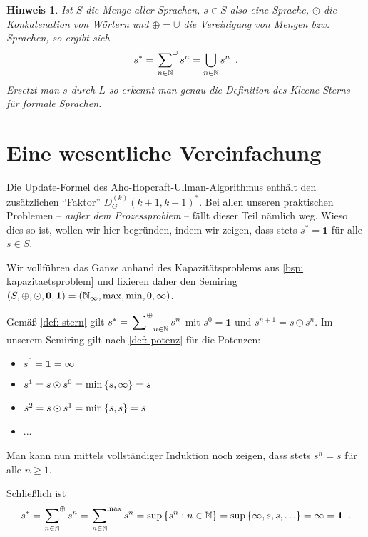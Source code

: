 \documentclass[ngerman, a4paper, 12pt]{article}
\newcommand{\satzende}{\enskip \text{.}}
\theoremstyle{mystyle}
\newtheorem{hinweis}[definition]{Hinweis}
\begin{document}
	\begin{hinweis}
		Ist $S$ die Menge aller Sprachen, $s \in S$ also eine Sprache, $\odot$ die Konkatenation von Wörtern und $\oplus = \cup$ die Vereinigung von Mengen bzw. Sprachen, so ergibt sich
		\begin{equation*}
			s^\ast = \sideset{}{^\cup}\sum_{n \in \N} s^n
			= \bigcup_{n \in \N} s^n
			\satzende
		\end{equation*}
		Ersetzt man $s$ durch $L$ so erkennt man genau die Definition des Kleene-Sterns für formale Sprachen. 
	\end{hinweis}
	
	\section{Eine wesentliche Vereinfachung}
	\label{sec: vereinfachung}
	
	Die Update-Formel des Aho-Hopcraft-Ullman-Algorithmus enthält den zusätzlichen \enquote{Faktor} $D_G^{(k)}(k+1, k+1)^\ast$. Bei allen unseren praktischen Problemen -- \textit{außer dem Prozessproblem} -- fällt dieser Teil nämlich weg. Wieso dies so ist, wollen wir hier begründen, indem wir zeigen, dass stets 
	$s^\ast = \mathbf{1}$ für alle $s \in S$.
	
	Wir vollführen das Ganze anhand des Kapazitätsproblems aus \cref{bsp: kapazitaetsproblem} und fixieren daher den Semiring $(S, \oplus, \odot, \mathbf{0}, \mathbf{1}) = (\mathbb{N}_\infty, \max, \min, 0, \infty)$.
	
	Gemäß \cref{def: stern} gilt $s^\ast = \sideset{}{^\oplus}\sum_{n \in \mathbb{N}} s^n$ mit $s^0 = \mathbf{1}$ und $s^{n+1} = s \odot s^n$. 
	Im unserem Semiring gilt nach \cref{def: potenz} für die Potenzen:
	\begin{itemize}
		\item $s^0 = \mathbf{1} = \infty$
		\item $s^1 = s \odot s^0 = \min \left\{ s, \infty \right\} = s$
		\item $s^2 = s \odot s^1 = \min \left\{ s, s \right\} = s$
		\item ...
	\end{itemize}
	Man kann nun mittels vollständiger Induktion noch zeigen, dass stets $s^n = s$ für alle $n \ge 1$.
	
	Schließlich ist
	\begin{equation*}
		s^\ast = \sideset{}{^\oplus}\sum_{n \in \N} s^n 
		= \sideset{}{^{\max}}\sum_{n \in \N} s^n 
		= \sup \menge{s^n : n \in \N} = \sup \menge{\infty , s, s, \dots} 
		= \infty 
		= \mathbf{1} \satzende
	\end{equation*}
	
\end{document}
